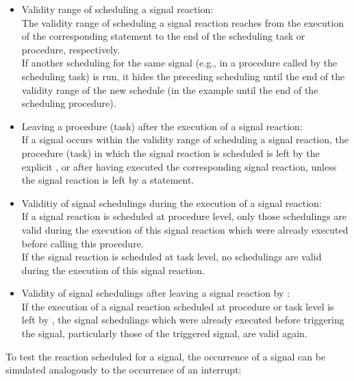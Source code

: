 \begin{itemize}
\item Validity range of scheduling a signal reaction:\\
The validity range of scheduling a signal reaction reaches from the
execution of the corresponding  statement to the end of the
scheduling task or procedure, respectively.\\
If another scheduling for the same signal (e.g., in a procedure called
by the scheduling task) is run, it hides the preceding scheduling until
the end of the validity range of the new schedule (in the example until
the end of the scheduling procedure).
\item Leaving a procedure (task) after the execution of a signal
reaction:\\
If a signal occurs within the validity range of scheduling a signal
reaction, the procedure (task) in which the signal reaction is scheduled
is left by 
the explicit ,  or 
 after having executed the 
corresponding signal reaction, unless the signal reaction is left by a 
 statement.
\item Validitiy of signal schedulings during the execution of a signal
reaction:\\
If a signal reaction is scheduled at procedure level, only those 
schedulings are valid during the execution of this signal reaction which
were already executed before calling this procedure.\\
If the signal reaction is scheduled at task level, no  schedulings are
valid during the execution of this signal reaction.
\item Validity of signal schedulings after leaving a signal reaction by
:\\
If the execution of a signal reaction scheduled at procedure or task
level is left by , the signal schedulings which were already
executed before triggering the signal, particularly those of the
triggered signal, are valid again.
\end{itemize}

To test the reaction scheduled for a signal, the occurrence of a signal
can be simulated analogously to the occurrence of an interrupt:

\begin{grammarframe}

\end{grammarframe}


